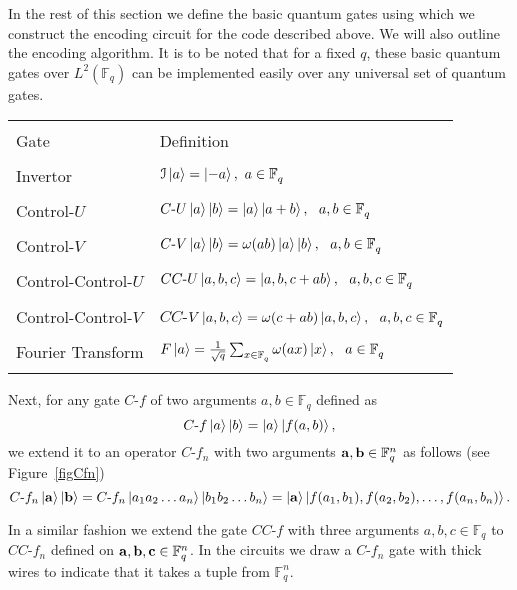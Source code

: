 \documentclass{Rinton-P9x6}
\newcommand {\ket} [1] {\ensuremath \left\vert#1\ensuremath \right\rangle}
\newcommand{\GF}[2][]{{\ensuremath{\mathbb{F}_{#2}^{#1}}}}
\renewcommand{\a}{{\bf a}}
\renewcommand{\b}{{\bf b}}
\renewcommand{\c}{{\bf c}}
\begin{document}

In the rest of this section we define the basic quantum gates using
which we construct the encoding circuit for the code described above.
We will also outline the encoding algorithm. It is to be noted that
for a fixed $q$, these basic quantum gates over $L^2(\GF{q})$ can be
implemented easily over any universal set of quantum gates.

\begin{tabular}{|l|l|}
\hline
&\\
Gate & Definition\\
\hline
&\\
Invertor & $\mathcal{I} \ket{a} = \ket{-a}, \ a \in \GF{q}$\\
\hfill{}
&\\
Control-$U$ & $C\textrm{-}U \ket{a}\ket{b} = \ket{a}\ket{ a + b},
 \ \ a,b \in \GF{q}$\\
&\\
Control-$V$ & $C\textrm{-}V\ket{a}\ket{b} = \omega(ab) \ket{a} 
\ket{b}, \ \ a,b \in \GF{q}$\\
&\\
Control-Control-$U$ & $CC\textrm{-}U \ket{a,b,c} = \ket{a,b,c + ab},
 \ \ a,b,c \in \GF{q}$\\
&\\
Control-Control-$V$ & $CC$-$V \ket{a,b,c} = \omega( c + a b) \ket{a,b,c},
 \ \ a,b,c \in \GF{q}$\\
&\\
Fourier Transform & $F \ket{a} = \frac{1}{\sqrt{q}} 
\sum_{x \in \GF{q}} \omega(ax) \ket{x}, \ \ a\in\GF{q}$\\
&\\
\hline
\end{tabular}

\vspace{5mm}

Next, for any gate $C$-$f$ of two arguments $a,b \in \GF{q}$ defined
as
\[
C\textrm{-}f \ket{a}\ket{b} = \ket{a}\ket{f(a,b)},
\]    
we extend it to an operator $C\textrm{-}f_n$ with two arguments $\a,\b
\in \GF[n]{q}$ as follows (see Figure~\ref{figCfn})
\[
C\textrm{-}f_n \ket{\a}\ket{\b} = C\textrm{-}f_n \ket{a_1a_2\ldots a_n}
\ket{b_1b_2\ldots b_n} = \ket{\a} \ket{f(a_1,b_1) , f(a_2,b_2), \ldots
,f(a_n,b_n)}.
\]

In a similar fashion we extend the gate $CC\textrm{-}f$ with three
arguments $a,b,c \in \GF{q}$ to $CC$-$f_n$ defined on $\a,\b,\c \in
\GF[n]{q}$. In the circuits we draw a $C$-$f_n$ gate with thick wires
to indicate that it takes a tuple from $\GF[n]{q}$.
\end{document}
